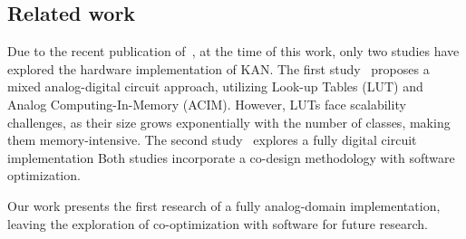 \subsection{Related work}

Due to the recent publication of~\cite{Liu:KAN2024}, at the time of this work, only two studies have explored the hardware implementation of KAN.
The first study~\cite{Huang:KANAcceletaror:2024} proposes a mixed analog-digital circuit approach, utilizing Look-up Tables (LUT) and Analog Computing-In-Memory (ACIM). However, LUTs face scalability challenges, as their size grows exponentially with the number of classes, making them memory-intensive.
The second study~\cite{VanDuy:KANCodesign:2024} explores a fully digital circuit implementation
Both studies incorporate a co-design methodology with software optimization. 


Our work presents the first research of a fully analog-domain implementation, leaving the exploration of co-optimization with software for future research. 
